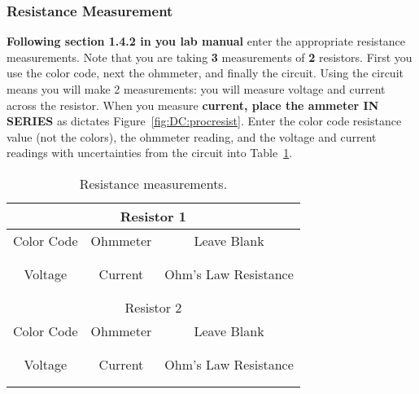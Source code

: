\subsubsection{Resistance Measurement}
\label{sec:DC:resist}

{\bf Following section 1.4.2 in you lab manual} enter the appropriate 
resistance measurements.  Note that you are taking {\bf 3} measurements of
{\bf 2} resistors.  First you use the color code, next the ohmmeter, and 
finally the circuit.  Using the circuit means you will make 2 measurements:
you will measure voltage and current across the resistor.  When you measure
{\bf current, place the ammeter IN SERIES} as dictates 
Figure~\ref{fig:DC:procresist}.   
Enter the color code resistance value (not the colors), the ohmmeter reading,
and the voltage and current readings with uncertainties from the circuit into 
Table~\ref{tab:DC:resistmeas}.
\begin{table}[htb]
\begin{center}
\begin{tabular}{|c|c|c|}
\hline
\multicolumn{3}{|c|}{Resistor 1} \\
\hline 
Color Code & Ohmmeter & Leave Blank\\ 
\hline
\hspace*{3cm} & \hspace*{3cm} & \hspace*{3cm} \\ 
& &  \\ 
\hline
Voltage & Current & Ohm's Law Resistance \\
\hline
& &  \\
& &  \\
\hline
\hline
\multicolumn{3}{|c|}{Resistor 2} \\
\hline 
Color Code & Ohmmeter & Leave Blank\\ 
\hline
\hspace*{3cm} & \hspace*{3cm} & \hspace*{3cm} \\ 
& &  \\ 
\hline
Voltage & Current & Ohm's Law Resistance \\
\hline
& &  \\
& &  \\
\hline
\end{tabular}
\end{center}
\caption{Resistance measurements.}
\label{tab:DC:resistmeas}
\end{table}


